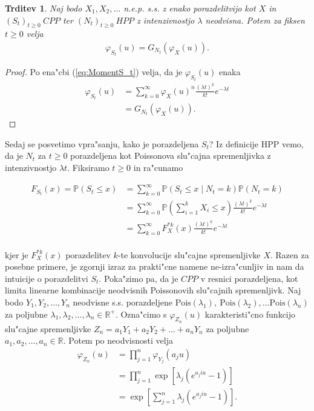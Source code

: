\documentclass[12pt, a4paper, reqno]{amsart}
\theoremstyle{definition} %
\theoremstyle{plain} %
\newtheorem{trditev}[definicija]{Trditev}
\newcommand{\R}{\mathbb{R}}
\newcommand{\Prob}{\mathbb{P}}
\newcommand{\1}{\mathds{1}}
\newcommand{\Pois}[1]{\text{Pois}(#1)}
\begin{document}
    \begin{trditev}
        Naj bodo $X_1, X_2, \dots$ n.e.p. s.s. z enako porazdelitvijo kot $X$ in
         $(S_t)_{t\geq 0}\ CPP$ ter $(N_t)_{t\geq 0}\ HPP$ z intenzivnostjo $\lambda$ neodvisna.
        Potem za fiksen $t\geq0$ velja
        \begin{align*}
            \varphi_{S_t}(u) = G_{N_t}\left(\varphi_{X}(u)\right).
        \end{align*}
        \label{trd:povezavaRodovneKarkateristicne}
    \end{trditev}

    \begin{proof}
        Po ena"cbi (\ref{eq:MomentS_t}) velja, da je $\varphi_{S_t}(u)$ enaka
        \begin{align*}
            \varphi_{S_t}(u) &= \sum_{k=0}^{\infty}
            \varphi_X(u)^n\frac{(\lambda t)^k}{k!}e^{-\lambda t} \\
            &= G_{N_t}\left(\varphi_X(u)\right).
        \end{align*}
    \end{proof}

    \noindent
    Sedaj se posvetimo vpra"sanju, kako je porazdeljena $S_t$? Iz definicije HPP vemo, da je 
    $N_t$ za $t\geq0$ porazdeljena kot Poissonova slu"cajna spremenljivka z intenzivnostjo 
    $\lambda t$. Fiksiramo $t\geq0$ in ra"cunamo

    \begin{align*}
        F_{S_t}(x) = \Prob(S_t \leq x) 
        &= \sum_{k=0}^\infty \Prob(S_t \leq x \mid N_t = k)\Prob(N_t = k) \\
        & = \sum_{k=0}^\infty \Prob(\sum_{i=1}^k X_i \leq x)\frac{(\lambda t)^k}{k!}e^{-\lambda t} \\
        & = \sum_{k=0}^\infty F_X^{*k}(x)\frac{(\lambda t)^k}{k!}e^{-\lambda t} \\
    \end{align*}

    \noindent
    kjer je $F_X^{*k}(x)$ porazdelitev $k$-te konvolucije slu"cajne spremenljivke $X$. Razen za 
    posebne primere, je zgornji izraz za prakti"cne namene ne-izra"cunljiv in nam da intuicije o 
    porazdelitvi $S_t$. Poka"zimo pa, da je $CPP$ v resnici porazdeljena, kot limita linearne 
    kombinacije neodvisnih Poissonovih slu"cajnih spremenljivk. Naj bodo $Y_1, Y_2, \dots, Y_n$
    neodvisne s.s. porazdeljene $\Pois{\lambda_1}, \ \Pois{\lambda_2}, \dots \Pois{\lambda_n}$ za 
    poljubne $\lambda_1, \lambda_2, \dots, \lambda_n \in \R^+$. 
    Ozna"cimo s $\varphi_{Z_n}(u)$ karakteristi"cno funkcijo slu"cajne spremenljivke 
    $Z_n = a_1Y_1 + a_2Y_2 + \dots + a_nY_n$ za poljubne $a_1, a_2, \dots, a_n \in \R$.
    Potem po neodvisnosti velja
    \begin{align*}
        \varphi_{Z_n}(u) 
                &= \prod_{j=1}^{n}\varphi_{Y_j}(a_ju)\\
                &= \prod_{j=1}^{n}\exp\left[\lambda_j\left(e^{a_j i u} - 1\right)\right] \\
                &= \exp\left[\sum_{j=1}^{n}\lambda_j\left(e^{a_j i u} - 1\right)\right].
    \end{align*}
\end{document}
